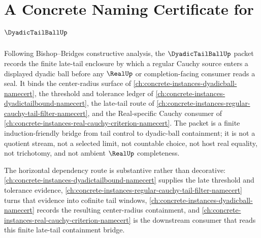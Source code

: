 \chapter{A Concrete Naming Certificate for $\DyadicTailBallUp$}
\label{ch:concrete-instances-dyadic-tail-ball-namecert}

Following Bishop--Bridges constructive analysis, the $\DyadicTailBallUp$ packet records the finite late-tail enclosure by which a regular Cauchy source enters a displayed dyadic ball before any $\RealUp$ or completion-facing consumer reads a seal. It binds the center-radius surface of \autoref{ch:concrete-instances-dyadicball-namecert}, the threshold and tolerance ledger of \autoref{ch:concrete-instances-dyadictailbound-namecert}, the late-tail route of \autoref{ch:concrete-instances-regular-cauchy-tail-filter-namecert}, and the Real-specific Cauchy consumer of \autoref{ch:concrete-instances-real-cauchy-criterion-namecert}. The packet is a finite induction-friendly bridge from tail control to dyadic-ball containment; it is not a quotient stream, not a selected limit, not countable choice, not host real equality, not trichotomy, and not ambient $\RealUp$ completeness.

The horizontal dependency route is substantive rather than decorative: \autoref{ch:concrete-instances-dyadictailbound-namecert} supplies the late threshold and tolerance evidence, \autoref{ch:concrete-instances-regular-cauchy-tail-filter-namecert} turns that evidence into cofinite tail windows, \autoref{ch:concrete-instances-dyadicball-namecert} records the resulting center-radius containment, and \autoref{ch:concrete-instances-real-cauchy-criterion-namecert} is the downstream consumer that reads this finite late-tail containment bridge.

